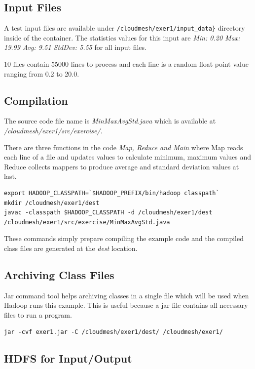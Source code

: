 \subsection{Input Files}

A test input files are available under
\verb|/cloudmesh/exer1/input_data}|
directory inside of the container.  The statistics values for this
input are \textit{Min: 0.20 Max: 19.99 Avg: 9.51 StdDev: 5.55} for all
input files.

10 files contain 55000 lines to process and each line is a random
float point value ranging from 0.2 to 20.0.

\subsection{Compilation}

The source code file name is \textit{MinMaxAvgStd.java} which is
available at \textit{/cloudmesh/exer1/src/exercise/}.

There are three functions in the code \textit{Map, Reduce and Main}
where Map reads each line of a file and updates values to calculate
minimum, maximum values and Reduce collects mappers to produce average
and standard deviation values at last.

\begin{lstlisting}
export HADOOP_CLASSPATH=`$HADOOP_PREFIX/bin/hadoop classpath`
mkdir /cloudmesh/exer1/dest
javac -classpath $HADOOP_CLASSPATH -d /cloudmesh/exer1/dest /cloudmesh/exer1/src/exercise/MinMaxAvgStd.java
\end{lstlisting}

These commands simply prepare compiling the example code and the
compiled class files are generated at the \textit{dest} location.

\subsection{Archiving Class Files}

Jar command tool helps archiving classes in a single file which will be used
when Hadoop runs this example. This is useful because a jar file contains all
necessary files to run a program.

\begin{lstlisting}
jar -cvf exer1.jar -C /cloudmesh/exer1/dest/ /cloudmesh/exer1/
\end{lstlisting}

\subsection{HDFS for Input/Output}

